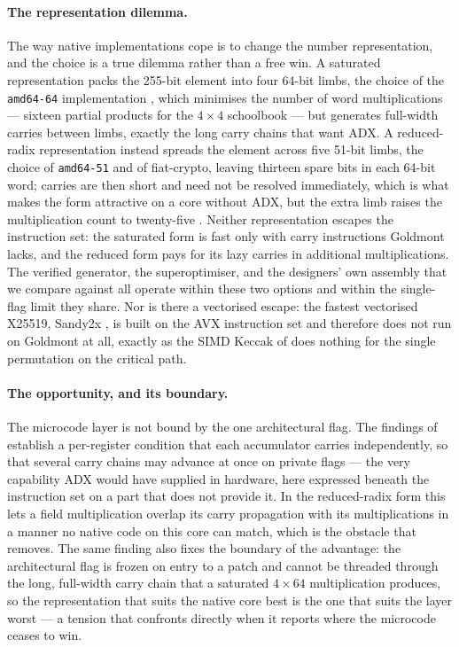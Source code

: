 \paragraph{The representation dilemma.}
The way native implementations cope is to change the number representation, and
the choice is a true dilemma rather than a free win. A saturated representation
packs the 255-bit element into four 64-bit limbs, the choice of the
\texttt{amd64-64} implementation \cite{bernsteinHighSpeedHighSecurity2012}, which
minimises the number of word multiplications --- sixteen partial products for the
$4\times4$ schoolbook --- but generates full-width carries between limbs, exactly
the long carry chains that want ADX. A reduced-radix representation instead
spreads the element across five 51-bit limbs, the choice of \texttt{amd64-51}
\cite{bernsteinHighSpeedHighSecurity2012} and of fiat-crypto, leaving thirteen
spare bits in each 64-bit word; carries are then short and need not be resolved
immediately, which is what makes the form attractive on a core without ADX, but
the extra limb raises the multiplication count to twenty-five
\cite{PKC:Bernstein06,erbsenSimpleHighLevel2019}. Neither representation escapes
the instruction set: the saturated form is fast only with carry instructions
Goldmont lacks, and the reduced form pays for its lazy carries in additional
multiplications. The verified generator, the superoptimiser, and the designers'
own assembly that we compare against
\cite{erbsenSimpleHighLevel2019,kuepperCryptOpt2023,bernsteinHighSpeedHighSecurity2012}
all operate within these two options and within the single-flag limit they share.
Nor is there a vectorised escape: the fastest vectorised X25519, Sandy2x
\cite{chouSandy2x2015}, is built on the AVX instruction set and therefore does not
run on Goldmont at all, exactly as the SIMD Keccak of
 does nothing for the single permutation on the
critical path.

\paragraph{The opportunity, and its boundary.}
The microcode layer is not bound by the one architectural flag. The findings of
 establish a per-register condition that each accumulator
carries independently, so that several carry chains may advance at once on private
flags --- the very capability ADX would have supplied in hardware, here expressed
beneath the instruction set on a part that does not provide it. In the
reduced-radix form this lets a field multiplication overlap its carry propagation
with its multiplications in a manner no native code on this core can match, which
is the obstacle that  removes. The same finding also fixes
the boundary of the advantage: the architectural flag is frozen on entry to a
patch and cannot be threaded through the long, full-width carry chain that a
saturated $4\times64$ multiplication produces, so the representation that suits the
native core best is the one that suits the layer worst --- a tension that
 confronts directly when it reports where the microcode
ceases to win.

